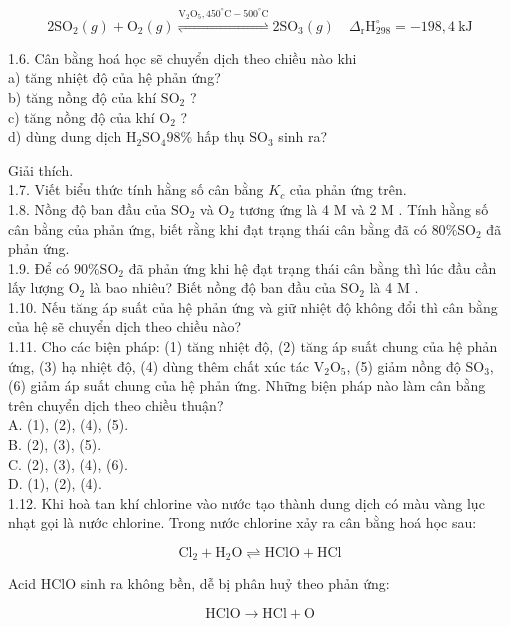 \documentclass[10pt]{article}
\begin{document}
$$
2 \mathrm{SO}_{2}(g)+\mathrm{O}_{2}(g) \stackrel{\mathrm{V}_{2} \mathrm{O}_{5}, 450^{\circ} \mathrm{C}-500^{\circ} \mathrm{C}}{\rightleftharpoons} 2 \mathrm{SO}_{3}(g) \quad \Delta_{\mathrm{r}} \mathrm{H}_{298}^{\circ}=-198,4 \mathrm{~kJ}
$$

1.6. Cân bằng hoá học sẽ chuyển dịch theo chiều nào khi\\
a) tăng nhiệt độ của hệ phản ứng?\\
b) tăng nồng độ của khí $\mathrm{SO}_{2}$ ?\\
c) tăng nồng độ của khí $\mathrm{O}_{2}$ ?\\
d) dùng dung dịch $\mathrm{H}_{2} \mathrm{SO}_{4} 98 \%$ hấp thụ $\mathrm{SO}_{3}$ sinh ra?

Giải thích.\\
1.7. Viết biểu thức tính hằng số cân bằng $K_{c}$ của phản ứng trên.\\
1.8. Nồng độ ban đầu của $\mathrm{SO}_{2}$ và $\mathrm{O}_{2}$ tương ứng là 4 M và 2 M . Tính hằng số cân bằng của phản ứng, biết rằng khi đạt trạng thái cân bằng đã có $80 \% \mathrm{SO}_{2}$ đã phản ứng.\\
1.9. Để có $90 \% \mathrm{SO}_{2}$ đã phản ứng khi hệ đạt trạng thái cân bằng thì lúc đầu cần lấy lượng $\mathrm{O}_{2}$ là bao nhiêu? Biết nồng độ ban đầu của $\mathrm{SO}_{2}$ là 4 M .\\
1.10. Nếu tăng áp suất của hệ phản ứng và giữ nhiệt độ không đổi thì cân bằng của hệ sẽ chuyển dịch theo chiều nào?\\
1.11. Cho các biện pháp: (1) tăng nhiệt độ, (2) tăng áp suất chung của hệ phản ứng, (3) hạ nhiệt độ, (4) dùng thêm chất xúc tác $\mathrm{V}_{2} \mathrm{O}_{5}$, (5) giảm nồng độ $\mathrm{SO}_{3}$, (6) giảm áp suất chung của hệ phản ứng. Những biện pháp nào làm cân bằng trên chuyển dịch theo chiều thuận?\\
A. (1), (2), (4), (5).\\
B. (2), (3), (5).\\
C. (2), (3), (4), (6).\\
D. (1), (2), (4).\\
1.12. Khi hoà tan khí chlorine vào nước tạo thành dung dịch có màu vàng lục nhạt gọi là nước chlorine. Trong nước chlorine xảy ra cân bằng hoá học sau:

$$
\mathrm{Cl}_{2}+\mathrm{H}_{2} \mathrm{O} \rightleftharpoons \mathrm{HClO}+\mathrm{HCl}
$$

Acid HClO sinh ra không bền, dễ bị phân huỷ theo phản ứng:

$$
\mathrm{HClO} \rightarrow \mathrm{HCl}+\mathrm{O}
$$
\end{document}
